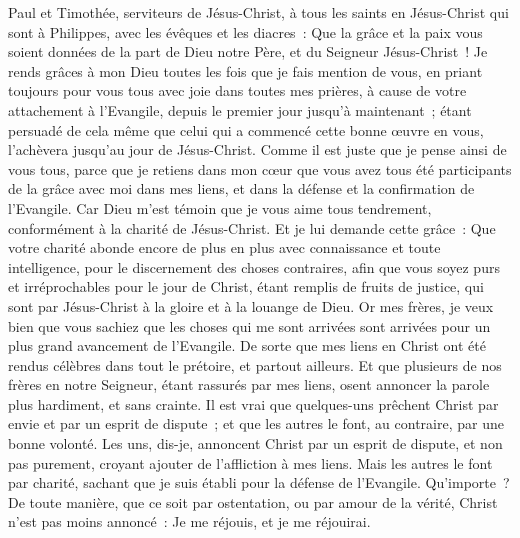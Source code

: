 \begin{multicols}{2}
\VerseOne{}Paul et Timothée, serviteurs de Jésus-Christ, à tous les saints en Jésus-Christ qui sont à Philippes, avec les évêques et les diacres~:
Que la grâce et la paix vous soient données de la part de Dieu notre Père, et du Seigneur Jésus-Christ~!
Je rends grâces à mon Dieu toutes les fois que je fais mention de vous,
en priant toujours pour vous tous avec joie dans toutes mes prières,
à cause de votre attachement à l'Evangile, depuis le premier jour jusqu'à maintenant~;
étant persuadé de cela même que celui qui a commencé cette bonne œuvre en vous, l'achèvera jusqu'au jour de Jésus-Christ.
Comme il est juste que je pense ainsi de vous tous, parce que je retiens dans mon cœur que vous avez tous été participants de la grâce avec moi dans mes liens, et dans la défense et la confirmation de l'Evangile.
Car Dieu m'est témoin que je vous aime tous tendrement, conformément à la charité de Jésus-Christ.
Et je lui demande cette grâce~: Que votre charité abonde encore de plus en plus avec connaissance et toute intelligence,
pour le discernement des choses contraires, afin que vous soyez purs et irréprochables pour le jour de Christ,
étant remplis de fruits de justice, qui sont par Jésus-Christ à la gloire et à la louange de Dieu.
Or mes frères, je veux bien que vous sachiez que les choses qui me sont arrivées sont arrivées pour un plus grand avancement de l'Evangile.
De sorte que mes liens en Christ ont été rendus célèbres dans tout le prétoire, et partout ailleurs.
Et que plusieurs de nos frères en notre Seigneur, étant rassurés par mes liens, osent annoncer la parole plus hardiment, et sans crainte.
Il est vrai que quelques-uns prêchent Christ par envie et par un esprit de dispute~; et que les autres le font, au contraire, par une bonne volonté.
Les uns, dis-je, annoncent Christ par un esprit de dispute, et non pas purement, croyant ajouter de l'affliction à mes liens.
Mais les autres le font par charité, sachant que je suis établi pour la défense de l'Evangile.
Qu'importe~? De toute manière, que ce soit par ostentation, ou par amour de la vérité, Christ n'est pas moins annoncé~: Je me réjouis, et je me réjouirai.

\end{multicols}
